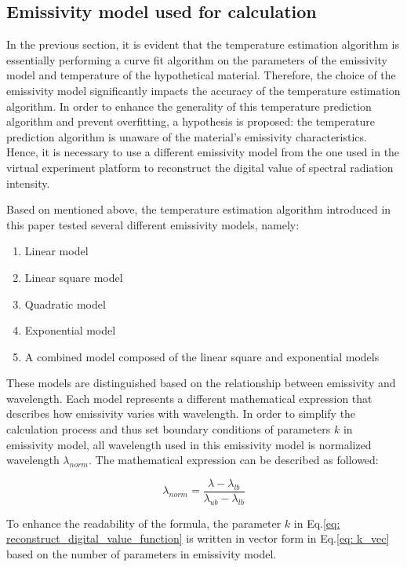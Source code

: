\subsection{Emissivity model used for calculation}
In the previous section, it is evident that the temperature estimation 
algorithm is essentially performing a curve fit algorithm on the parameters of the 
emissivity model and temperature of the hypothetical material. 
Therefore, the choice of the emissivity model significantly impacts 
the accuracy of the temperature estimation algorithm. In order to 
enhance the generality of this temperature prediction algorithm and 
prevent overfitting, a hypothesis is proposed: the temperature 
prediction algorithm is unaware of the material's emissivity 
characteristics. Hence, it is necessary to use a different 
emissivity model from the one used in the virtual experiment 
platform to reconstruct the digital value of spectral radiation 
intensity.


Based on mentioned above, the temperature estimation algorithm 
introduced in this paper tested several different emissivity 
models, namely:


\begin{enumerate}
  \item Linear model
  \item Linear square model
  \item Quadratic model
  \item Exponential model
  \item A combined model composed of the linear square and exponential models
\end{enumerate}


These models are distinguished based on the relationship between 
emissivity and wavelength. Each model represents a different 
mathematical expression that describes how emissivity varies with 
wavelength. In order to simplify the calculation process and thus set 
boundary conditions of parameters $k$ in emissivity model, all wavelength 
used in this emissivity model is normalized wavelength $\lambda_{norm}$. The 
mathematical expression can be described as followed:

\begin{equation}
  \label{eq: wavelength_norm}
  \lambda_{norm} = \frac{\lambda - \lambda_{lb}}{\lambda_{ub} - \lambda_{lb}}
\end{equation}


To enhance the readability of the formula, the parameter $k$ in 
Eq.\ref{eq: reconstruct_digital_value_function} is written in vector 
form in Eq.\ref{eq: k_vec} based on the number of parameters in emissivity model.


